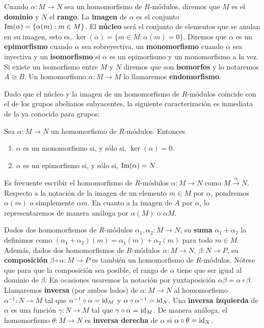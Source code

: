 Cuando \(\alpha: M \rightarrow N\) sea un homomorfismo de \(R\)-módulos, diremos que
\(M\) es el \textbf{dominio} y \(N\) el \textbf{rango}. La \textbf{imagen} de
\(\alpha\) es el conjunto \(\operatorname{Im}(\alpha) = \{ \alpha(m) : m \in M \}\). El \textbf{núcleo}
será el conjunto de elementos que se anulan en su imagen, esto es,
\(\ker(\alpha) = \{ m \in M : \alpha(m) = 0 \}\). Diremos que \(\alpha\) es un \textbf{epimorfismo}
cuando \(\alpha\) sea sobreyectiva, un \textbf{monomorfismo} cuando \(\alpha\) sea
inyectiva y un \textbf{isomorfismo} si \(\alpha\) es un epimorfismo y un monomorfismo
a la vez. Si existe un isomorfismo entre \(M\) y \(N\) diremos que son \textbf{isomorfos}
y lo notaremos \(A \cong B\). Un homomorfismo \(\alpha: M \rightarrow M\) lo
llamaremos \textbf{endomorfismo}.

Dado que el núcleo y la imagen de un homomorfismo de \(R\)-módulos coincide con el
de los grupos abelianos subyacentes, la siguiente caracterización es inmediata
de la ya conocida para grupos:

\begin{proposicion}
	Sea \(\alpha: M \to N\) un homomorfismo de \(R\)-módulos. Entonces
	\begin{enumerate}
		\item \(\alpha\) es un monomorfismo si, y sólo si, \(\ker(\alpha) = 0\).
		
		\item \(\alpha\) es un epimorfismo si, y sólo si, \(\operatorname{Im}(\alpha) = N\).
	\end{enumerate}
\end{proposicion}

Es frecuente escribir el homomorfismo de \(R\)-módulos \(\alpha: M \rightarrow N\) como
\(M \xrightarrow{\alpha}N\). Respecto a la notación de la imagen de un elemento
\(m \in M\) por \(\alpha\), pondremos \(\alpha(m)\) o simplemente \(\alpha m\). En
cuanto a la imagen de \(A\) por \(\alpha\), lo representaremos de manera análoga por
\(\alpha(M)\) o \(\alpha M\).

Dados dos homomorfismos de \(R\)-módulos \(\alpha_{1}, \alpha_{2}: M \rightarrow N\),
su \textbf{suma} \(\alpha_{1}+ \alpha_{2}\) la definimos como \((\alpha_{1}+ \alpha_{2}
)(m) = \alpha_{1}(m) + \alpha_{2}(m)\) para todo \(m \in M\). Además, dados dos homomorfismos
de \(R\)-módulos \(\alpha: M \rightarrow N\), \(\beta: N \rightarrow P\), su \textbf{composición}
\(\beta \circ \alpha: M \rightarrow P\) es también un homomorfismo de \(R\)-módulos.
Nótese que para que la composición sea posible, el rango de \(\alpha\) tiene que
ser igual al dominio de \(\beta\). En ocasiones usaremos la notación por yuxtaposición
\(\alpha\beta = \alpha \circ \beta\). Llamaremos \textbf{inversa} (por ambos lados)
de \(\alpha : M \rightarrow N\) al homomorfismo \(\alpha^{-1}: N \rightarrow M\) tal
que \(\alpha^{-1}\circ \alpha = \operatorname{id}_{M}\) y \(\alpha \circ \alpha^{-1}= \operatorname{id}_{N}\).
Una \textbf{inversa izquierda} de \(\alpha\) es una función \(\gamma: N \rightarrow
M\) tal que \(\gamma \circ \alpha = \operatorname{id}_{M}\). De manera análoga, el homomorfismo \(\theta
: M \to N\) es \textbf{inversa derecha} de \(\alpha\) si
\(\alpha \circ \theta = \operatorname{id}_{N}\).

